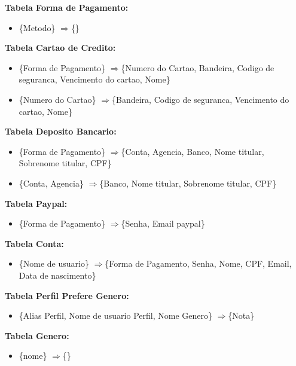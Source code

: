 \documentclass[12pt,a4paper]{article}
\newcommand{\rarrow}{$\Longrightarrow$}
\begin{document}
    {\bf Tabela Forma de Pagamento: }
    \begin{itemize}
        \item \{Metodo\} \rarrow \{\} \\
    \end{itemize}
    
    {\bf Tabela Cartao de Credito: }
    \begin{itemize}
        \item \{Forma de Pagamento\} \rarrow \{Numero do Cartao, Bandeira, Codigo de seguranca, Vencimento do cartao, Nome\}
        \item \{Numero do Cartao\} \rarrow \{Bandeira, Codigo de seguranca, Vencimento do cartao, Nome\} \\
    \end{itemize}
    
    {\bf Tabela Deposito Bancario: }
    \begin{itemize}
        \item \{Forma de Pagamento\} \rarrow \{Conta, Agencia, Banco, Nome titular, Sobrenome titular, CPF\}
        \item \{Conta, Agencia\} \rarrow \{Banco, Nome titular, Sobrenome titular, CPF\}\\
    \end{itemize}
    
    {\bf Tabela Paypal: }
    \begin{itemize}
        \item \{Forma de Pagamento\} \rarrow \{Senha, Email paypal\} \\
    \end{itemize}
    
    {\bf Tabela Conta: }
    \begin{itemize}
        \item \{Nome de usuario\} \rarrow \{Forma de Pagamento, Senha, Nome, CPF, Email, Data de nascimento\} \\
    \end{itemize}
    
    {\bf Tabela Perfil Prefere Genero: }
    \begin{itemize}
        \item \{Alias Perfil, Nome de usuario Perfil, Nome Genero\} \rarrow \{Nota\} \\
    \end{itemize}
    
    {\bf Tabela Genero: }
    \begin{itemize}
        \item \{nome\} \rarrow \{\} \\
    \end{itemize}
    
\end{document}
